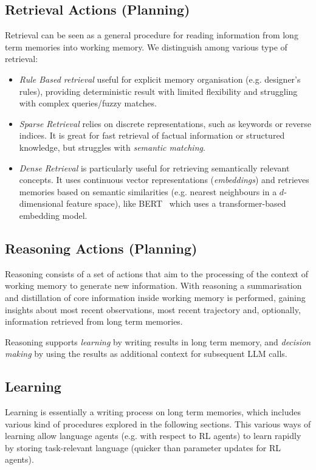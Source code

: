\subsection{Retrieval Actions (Planning)}
Retrieval can be seen as a general procedure for reading information from long
term memories into working memory. We distinguish among various type of
retrieval:
\begin{itemize}
    \item \emph{Rule Based retrieval} useful for explicit memory organisation
        (e.g. designer's rules), providing deterministic result with limited
        flexibility and struggling with complex queries/fuzzy matches.
    \item \emph{Sparse Retrieval} relies on discrete representations, such as
        keywords or reverse indices. It is great for fast retrieval of factual
        information or structured knowledge, but struggles with \emph{semantic
        matching}.
    \item \emph{Dense Retrieval} is particularly useful for retrieving
        semantically relevant concepts. It uses continuous vector
        representations (\emph{embeddings}) and retrieves memories based on
        semantic similarities (e.g. nearest neighbours in a $d$-dimensional
        feature space), like
        BERT~\cite{devlin2019bertpretrainingdeepbidirectional} which uses a
        transformer-based embedding model.
\end{itemize}

\subsection{Reasoning Actions (Planning)}
Reasoning consists of a set of actions that aim to the processing of the
context of working memory to generate new information. With reasoning a
summarisation and distillation of core information inside working memory is
performed, gaining insights about most recent observations, most recent
trajectory and, optionally, information retrieved from long term memories.

Reasoning supports \emph{learning} by writing results in long term memory, and
\emph{decision making} by using the results as additional context for
subsequent \ac{LLM} calls.

\subsection{Learning}\label{ssec:learning}
Learning is essentially a writing process on long term memories, which includes
various kind of procedures explored in the following sections. This various
ways of learning allow language agents (e.g. with respect to \ac{RL} agents) to
learn rapidly by storing task-relevant language (quicker than parameter updates
for \ac{RL} agents).

